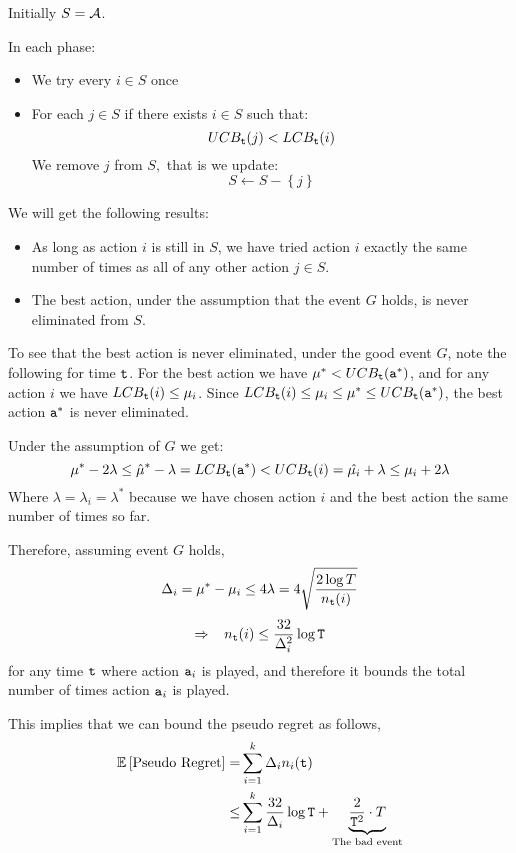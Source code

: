 Initially $S=\mathcal{A}$.

In each phase:
\begin{itemize}
\item We try every $i\in S$ once
\item For each $j\in S$ if there exists $i\in S$ such that:
\[
UCB_{{\tt t}}(j)<LCB_{{\tt t}}(i)
\]
 We remove $j$ from $S,$ that is we update:
\[
S\leftarrow S-\left\{ j\right\}
\]
\end{itemize}
We will get the following results:
\begin{itemize}
\item As long as action $i$ is still in $S$, we have tried action $i$ exactly the
same number of times as all of any other action $j\in S$.
\item The best action, under the assumption that the event $G$ holds, is never eliminated
from $S$.
\end{itemize}
To see that the best action is never eliminated, under the good event $G$, note the following for time ${\tt t}$. For the best action we have $\mu^*< UCB_{{\tt t}}({\tt a}^*)$, and for any action $i$ we have $LCB_{\tt t}(i)\leq \mu_i$. Since $LCB_{\tt t}(i)\leq \mu_i\leq \mu^*\leq UCB_{\tt t}({\tt a}^*)$, the best action ${\tt a}^*$ is never eliminated.

Under the assumption of $G$ we get:
\[
\mu^{*}-2\lambda\le\hat{\mu}^{*}-\lambda=LCB_{\tt t}({\tt a}^*)<UCB_{\tt t}(i)=\hat{\mu_{i}}+\lambda\leq\mu_{i}+2\lambda
\]
Where $\lambda=\lambda_{i}=\lambda^{*}$ because we have chosen action $i$ and the best action the same number of times so far.

Therefore, assuming event $G$ holds,
\[
\Delta_{i}=\mu^{*}-\mu_{i}\le4\lambda=4\sqrt{\frac{2\log
T}{n_{{\tt t}}(i)}}
\]
\[
\Rightarrow\;\;\; n_{{\tt t}}(i)\le\frac{32}{\Delta_{i}^{2}}\log {\tt T}
\]
for any time ${\tt t}$ where action ${\tt a}_i$ is played, and therefore it bounds the total number of times action ${\tt a}_i$ is played.

This implies that we can bound the pseudo regret as follows,
\begin{align*}
\mathbb{E}\left[\text{Pseudo Regret}\right]  = &  \sum_{i=1}^{k}\Delta_{i}n_{i}({\tt t})\\
  \le &  \sum_{i=1}^{k}\frac{32}{\Delta_{i}}\log {\tt T}
  +\underbrace{\frac{2}{{\tt T}^{2}}\cdot T}_{\text{The bad event}}
\end{align*}



